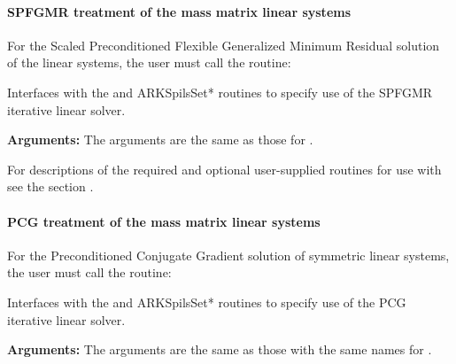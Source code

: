 \documentclass[letterpaper,10pt,english]{sphinxmanual}
\begin{document}
\paragraph{SPFGMR treatment of the mass matrix linear systems}
\label{f_interface/Usage:spfgmr-treatment-of-the-mass-matrix-linear-systems}
For the Scaled Preconditioned Flexible Generalized Minimum Residual
solution of the linear systems, the user must call the
{\hyperref[f_interface/Usage:f/_/FARKMASSSPFGMR]{\emph{}}} routine:

\begin{fulllineitems}
\label{f_interface/Usage:f/_/FARKMASSSPFGMR}
Interfaces with the {\hyperref[c_interface/User_callable:c.ARKMassSpfgmr]{\emph{}}} and
ARKSpilsSet* routines to specify use of the SPFGMR iterative
linear solver.

\textbf{Arguments:}  The arguments are the same as those for
{\hyperref[f_interface/Usage:f/_/FARKMASSSPGMR]{\emph{}}}.

\end{fulllineitems}


For descriptions of the required and optional user-supplied routines
for use with {\hyperref[f_interface/Usage:f/_/FARKMASSSPFGMR]{\emph{}}} see the section
{\hyperref[f_interface/Usage:finterface-massspilsusersupplied]{\emph{}}}.


\paragraph{PCG treatment of the mass matrix linear systems}
\label{f_interface/Usage:pcg-treatment-of-the-mass-matrix-linear-systems}
For the Preconditioned Conjugate Gradient solution of symmetric linear
systems, the user must call the {\hyperref[f_interface/Usage:f/_/FARKMASSPCG]{\emph{}}} routine:

\begin{fulllineitems}
\label{f_interface/Usage:f/_/FARKMASSPCG}
Interfaces with the {\hyperref[c_interface/User_callable:c.ARKMassPcg]{\emph{}}} and
ARKSpilsSet* routines to specify use of the PCG iterative
linear solver.

\textbf{Arguments:}  The arguments are the same as those with the
same names for {\hyperref[f_interface/Usage:f/_/FARKMASSSPGMR]{\emph{}}}.

\end{fulllineitems}
\end{document}

